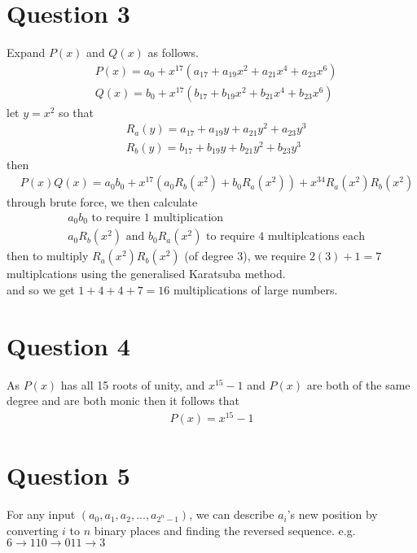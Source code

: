 \documentclass{article}
\begin{document}
\section*{Question 3}
Expand $P(x)$ and $Q(x)$ as follows.
\begin{align*}
    & P(x) = a_0 + x^{17}(a_{17} + a_{19}x^{2} + a_{21}x^4 + a_{23}x^6)\\
    & Q(x) = b_0 + x^{17}(b_{17} + b_{19}x^{2} + b_{21}x^4 + b_{23}x^6)
\end{align*}
let $y = x^2$ so that
\begin{align*}
    & R_a(y) = a_{17} + a_{19}y + a_{21}y^2 + a_{23}y^3\\
    & R_b(y) = b_{17} + b_{19}y + b_{21}y^2 + b_{23}y^3
\end{align*}
then
\begin{align*}
    & P(x)Q(x) = a_0b_0 + x^{17}(a_0R_b(x^2) + b_0R_a(x^2)) + x^{34}R_a(x^2)R_b(x^2)
\end{align*}
through brute force, we then calculate
\begin{align*}
    & a_0b_0 \text{ to require 1 multiplication}\\
    & a_0R_b(x^2) \text{ and } b_0R_a(x^2) \text{ to require 4 multiplcations each}
\end{align*}
then to multiply $R_a(x^2)R_b(x^2)$ (of degree 3), we require $2(3)+1 = 7$ multiplcations using the generalised Karatsuba method.\\
and so we get $1 + 4 + 4 + 7 = 16$ multiplications of large numbers.

\section*{Question 4}
As $P(x)$ has all 15 roots of unity, and $x^{15} - 1$ and $P(x)$ are both of the same degree and are both monic then it follows that
\begin{gather*}
P(x) = x^{15} -1
\end{gather*}

\section*{Question 5}
For any input $(a_0, a_1, a_2, ..., a_{2^n-1})$, we can describe $a_i$'s new position by converting $i$ to $n$ binary places and finding the reversed sequence.
e.g. $6 \rightarrow 110 \rightarrow 011 \rightarrow 3$
\end{document}
